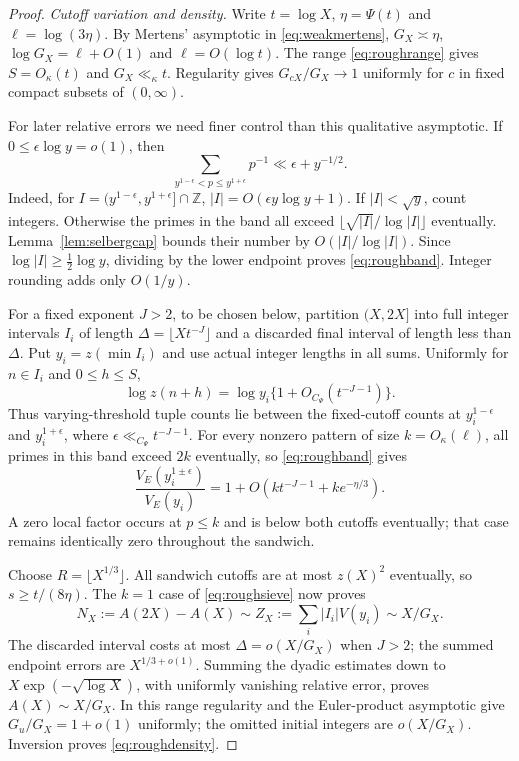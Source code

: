 \documentclass[11pt,a4paper]{article}
\newcommand{\Z}{\mathbb Z}
\begin{document}
\begin{proof}
\smallskip\noindent\emph{Cutoff variation and density.}
Write $t=\log X$, $\eta=\Psi(t)$ and $\ell=\log(3\eta)$.
By Mertens' asymptotic in \eqref{eq:weakmertens},
$G_X\asymp\eta$, $\log G_X=\ell+O(1)$ and $\ell=O(\log t)$.
The range \eqref{eq:roughrange} gives $S=O_\kappa(t)$ and
$G_X\ll_\kappa t$.
Regularity gives $G_{cX}/G_X\to1$ uniformly for $c$ in fixed compact
subsets of $(0,\infty)$.

For later relative errors we need finer control than this qualitative
asymptotic. If $0\le\epsilon\log y=o(1)$, then
\begin{equation}\label{eq:roughband}
 \sum_{y^{1-\epsilon}<p\le y^{1+\epsilon}}p^{-1}
       \ll\epsilon+y^{-1/2}.
\end{equation}
Indeed, for $I=(y^{1-\epsilon},y^{1+\epsilon}]\cap\Z$,
$|I|=O(\epsilon y\log y+1)$.
If $|I|<\sqrt y$, count integers. Otherwise the primes in the band
all exceed $\lfloor\sqrt{|I|}/\log|I|\rfloor$ eventually.
Lemma~\ref{lem:selbergcap} bounds their number by $O(|I|/\log|I|)$.
Since $\log|I|\ge\tfrac12\log y$, dividing by the lower endpoint proves
\eqref{eq:roughband}. Integer rounding adds only $O(1/y)$.

For a fixed exponent $J>2$, to be chosen below, partition $(X,2X]$
into full integer intervals $I_i$ of length
$\Delta=\lfloor Xt^{-J}\rfloor$ and a discarded final interval of
length less than $\Delta$. Put $y_i=z(\min I_i)$ and use actual integer
lengths in all sums. Uniformly for $n\in I_i$ and $0\le h\le S$,
\[
 \log z(n+h)=\log y_i\{1+O_{C_\Psi}(t^{-J-1})\}.
\]
Thus varying-threshold tuple counts lie between the fixed-cutoff
counts at $y_i^{1-\epsilon}$ and $y_i^{1+\epsilon}$, where
$\epsilon\ll_{C_\Psi}t^{-J-1}$.
For every nonzero pattern of size $k=O_\kappa(\ell)$, all primes in
this band exceed $2k$ eventually, so \eqref{eq:roughband} gives
\begin{equation}\label{eq:roughbandproduct}
 \frac{V_E(y_i^{1\pm\epsilon})}{V_E(y_i)}
       =1+O\!\left(k t^{-J-1}+k e^{-\eta/3}\right).
\end{equation}
A zero local factor occurs at $p\le k$ and is below both cutoffs
eventually; that case remains identically zero throughout the sandwich.

Choose $R=\lfloor X^{1/3}\rfloor$. All sandwich cutoffs are at most
$z(X)^2$ eventually, so $s\ge t/(8\eta)$.
The $k=1$ case of \eqref{eq:roughsieve} now proves
\[
 N_X:=A(2X)-A(X)\sim Z_X:=\sum_i|I_i|V(y_i)\sim X/G_X.
\]
The discarded interval costs at most $\Delta=o(X/G_X)$ when $J>2$;
the summed endpoint errors are $X^{1/3+o(1)}$.
Summing the dyadic estimates down to $X\exp(-\sqrt{\log X})$, with uniformly
vanishing relative error, proves
$A(X)\sim X/G_X$. In this range regularity and the Euler-product
asymptotic give $G_u/G_X=1+o(1)$ uniformly; the omitted initial
integers are $o(X/G_X)$. Inversion proves \eqref{eq:roughdensity}.


\end{proof}
\end{document}
